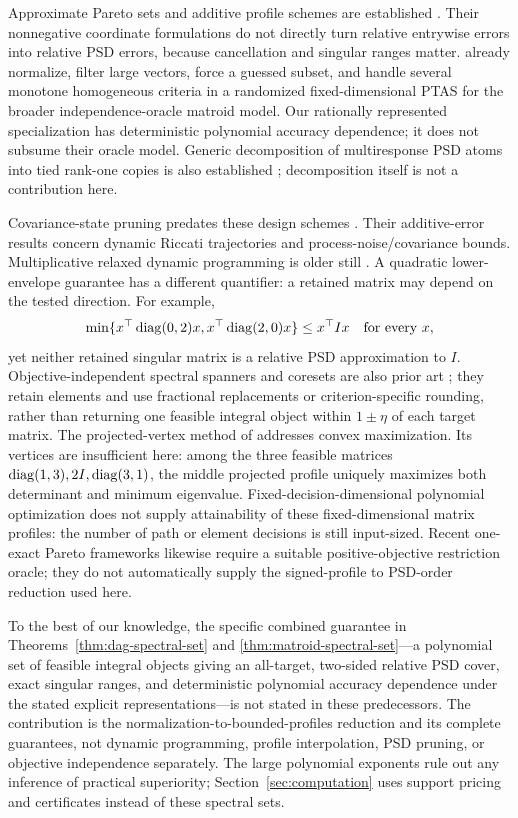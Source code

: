 Approximate Pareto sets and additive profile schemes are established
\citep{Papadimitriou2000,Tsaggouris2009,Mittal2013}. Their nonnegative
coordinate formulations do not directly turn relative entrywise errors into
relative PSD errors, because cancellation and singular ranges matter.
\citet{Brown2024} already normalize, filter large vectors, force a guessed
subset, and handle several monotone homogeneous criteria in a randomized
fixed-dimensional PTAS for the broader independence-oracle matroid model.
Our rationally represented specialization has deterministic polynomial
accuracy dependence; it does not subsume their oracle model.
Generic decomposition of multiresponse PSD atoms into tied rank-one copies
is also established \citep[Theorem 1]{Filova2026}; decomposition itself is
not a contribution here.

Covariance-state pruning predates these design schemes
\citep{Vitus2012,Atanasov2014}. Their additive-error results concern dynamic
Riccati trajectories and process-noise/covariance bounds. Multiplicative
relaxed dynamic programming is older still
\citep{Alriksson2005,Lincoln2006}. A quadratic lower-envelope guarantee has
a different quantifier: a retained matrix may depend on the tested direction.
For example,
\[
 \min\{x^\top\operatorname{diag}(0,2)x,x^\top\operatorname{diag}(2,0)x\}\le x^\top Ix
 \quad\text{for every }x,
\]
yet neither retained singular matrix is a relative PSD approximation to $I$.
Objective-independent spectral spanners and coresets are also prior art
\citep{Indyk2020,Mahabadi2026}; they retain elements and use fractional
replacements or criterion-specific rounding, rather than returning one
feasible integral object within $1\pm\eta$ of each target matrix.
The projected-vertex method of \citet{Onn2004} addresses convex
maximization. Its vertices are insufficient here: among the three
feasible matrices $\operatorname{diag}(1,3),2I,\operatorname{diag}(3,1)$, the middle projected profile
uniquely maximizes both determinant and minimum eigenvalue.
Fixed-decision-dimensional polynomial optimization \citep{DeLoera2008}
does not supply attainability of these fixed-dimensional matrix profiles:
the number of path or element decisions is still input-sized. Recent
one-exact Pareto frameworks \citep{Bokler2026} likewise require a suitable
positive-objective restriction oracle; they do not automatically supply
the signed-profile to PSD-order reduction used here.

To the best of our knowledge, the specific combined guarantee in
Theorems~\ref{thm:dag-spectral-set} and \ref{thm:matroid-spectral-set}---a
polynomial set of feasible integral objects giving an all-target, two-sided
relative PSD cover, exact singular ranges, and deterministic polynomial
accuracy dependence under the stated explicit representations---is not
stated in these predecessors. The contribution is the
normalization-to-bounded-profiles reduction and its complete guarantees,
not dynamic programming, profile interpolation, PSD pruning, or objective
independence separately. The large polynomial exponents rule out any
inference of practical superiority; Section~\ref{sec:computation} uses
support pricing and certificates instead of these spectral sets.
